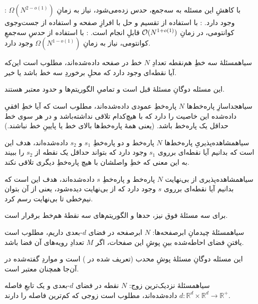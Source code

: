         :
        با کاهشِ این مسئله به سه‌جمع، حدس زده‌می‌شود، نیاز به زمانِ
        $\Omega(N^{2 - o(1)})$
        وجود دارد.
        :
        با استفاده از تقسیم و حل با افرازِ صفحه و استفاده از جست‌وجوی کوانتومی، در زمانِ 
        $\mathcal{O}(N^{1 + o(1)})$
        قابلِ انجام است.
        :
        با استفاده از حدسِ سه‌جمعِ کوانتومی، نیاز به زمانِ
        $\Omega(N^{1 - o(1)})$
        وجود دارد.
    
    ‌سیاه{مسئلهٔ سه خطِ هم‌نقطه}  تعدادِ $N$ خط در صفحه داده‌شده‌اند، مطلوب است این‌که آیا نقطه‌ای وجود دارد که محلِ برخوردِ سه خط باشد یا خیر. 

    این مسئله دوگانِ مسئلهٔ قبل است و تمامیِ الگوریتم‌ها و حدود معتبر هستند.
    
   ‌سیاه{جداسازِ پاره‌خط‌ها} $N$ پاره‌خطِ عمودی داده‌شده‌اند، مطلوب است که آیا خطِ افقیِ داده‌شده این خاصیت را دارد که با هیچ‌کدام تلاقی نداشته‌باشد و در هر سوی خط حداقل یک پاره‌خط باشد. (یعنی همهٔ پاره‌خط‌ها بالای خط یا پایینِ خط نباشند.)
    
   ‌سیاه{مشاهده‌پذیریِ پاره‌خط‌ها} $N$ پاره‌خط و دو پاره‌خطِ $s_1$ و $s_2$ داده‌شده‌اند، هدف این است که بدانیم آیا نقطه‌ای برروی $s_1$ وجود دارد که بتواند حداقل یک نقطه از $s_2$ را ببیند به این معنی که خطِ واصلشان با هیچ پاره‌خطِ دیگری تلاقی نکند.
   
    ‌سیاه{مشاهده‌پذیری از بی‌نهایت} $N$ پاره‌خط و پاره‌خطِ $s$ داده‌شده‌اند، هدف این است که بدانیم آیا نقطه‌ای برروی $s$ وجود دارد که از بی‌نهایت دیده‌شود، یعنی از آن بتوان نیم‌خطی تا بی‌نهایت رسم کرد. 
    
    برای سه مسئلهٔ فوق نیز، حدها و الگوریتم‌های سه نقطهٔ هم‌خط برقرار است.  
    
    ‌سیاه{مسئلهٔ چیدمانِ ابرصفحه‌ها}: $N$ ابرصفحه در فضای $d$-بعدی داریم، مطلوب است یافتنِ فضای احاطه‌شده بینِ پوشِ این صفحات،‌ اگر $M$ تعدادِ رویه‌های آن فضا باشد.
     
    این مسئله دوگانِ مسئلهٔ پوشِ محدب (تعریف شده در ) است و مواردِ گفته‌شده در آن‌جا همچنان معتبر است. 
   
    

    ‌سیاه{مسئلهٔ نزدیک‌ترین زوج}: 
    \(N\)
    نقطه در فضای \(d\)-بعدی و یک تابعِ فاصله 
    \(d: \mathbb{R}^d \times \mathbb{R}^d \to \mathbb{R}^+\)
    داده‌شده‌اند، مطلوب است زوجی که کم‌ترین فاصله را دارند. 

